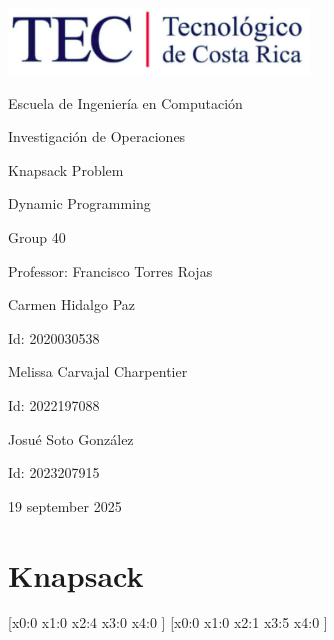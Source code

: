\documentclass{article}
\begin{document}
\begin{titlepage}
    \centering
    \includegraphics[width=0.6\textwidth]{logo-tec.png}\par\vspace{1cm}

    {\large Escuela de Ingeniería en Computación\par}
    {\large Investigación de Operaciones\par}
    \vspace{2cm}

    {\Large Knapsack Problem\par}
    {\large Dynamic Programming\par}
    \vspace{2cm}

    {\large Group 40\par}
    {\large Professor: Francisco Torres Rojas\par}
    \vspace{3cm}

    {\large Carmen Hidalgo Paz\par}
    {\large Id: 2020030538\par}
    \vspace{1cm}
    {\large Melissa Carvajal Charpentier\par}
    {\large Id: 2022197088\par}
    \vspace{1cm}
    {\large Josué Soto González\par}
    {\large Id: 2023207915\par}
    \vspace{1cm}

    {\large 19 september 2025\par}
\end{titlepage}

\newpage


\section{Knapsack}
[x0:0 x1:0 x2:4 x3:0 x4:0 ]
[x0:0 x1:0 x2:1 x3:5 x4:0 ]
\end{document}
